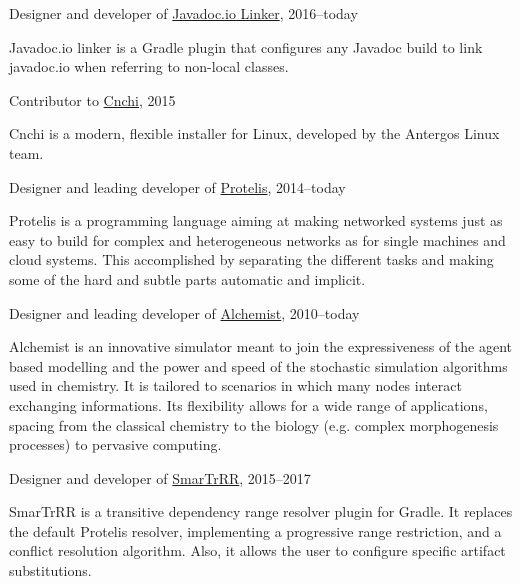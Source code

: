 \documentclass[10pt]{article}
\newenvironment{innerlist}[1][\enskip\textbullet]%
        {\begin{compactitem}[#1]}{\end{compactitem}}
\newcommand{\halfblankline}{\quad\vspace{-0.5\baselineskip}\pagebreak[3]}
\begin{document}
Designer and developer of \href{https://github.com/DanySK/javadoc.io-linker}{Javadoc.io Linker}, 2016--today
\begin{innerlist}
    \item Javadoc.io linker is a Gradle plugin that configures any Javadoc build to link javadoc.io when referring to non-local classes.
\end{innerlist}
\halfblankline

Contributor to \href{https://github.com/Antergos/Cnchi}{Cnchi}, 2015
\begin{innerlist}
    \item Cnchi is a modern, flexible installer for Linux, developed by the Antergos Linux team.
\end{innerlist}
\halfblankline

Designer and leading developer of \href{http://protelis.org/}{Protelis}, 2014--today
\begin{innerlist}
    \item Protelis is a programming language aiming at making networked systems just as easy to build for complex and heterogeneous networks as for single machines and cloud systems. This accomplished by separating the different tasks and making some of the hard and subtle parts automatic and implicit.
\end{innerlist}
\halfblankline

Designer and leading developer of \href{http://alchemist.apice.unibo.it/}{Alchemist}, 2010--today
\begin{innerlist}
    \item Alchemist is an innovative simulator meant to join the expressiveness of the agent based modelling and the power and speed of the stochastic simulation algorithms used in chemistry. It is tailored to scenarios in which many nodes interact exchanging  informations. Its flexibility allows for a wide range of applications, spacing from the classical chemistry to the biology (e.g. complex morphogenesis processes) to pervasive computing.
\end{innerlist}
\halfblankline

Designer and developer of \href{https://github.com/DanySK/SmarTrRR}{SmarTrRR}, 2015--2017
\begin{innerlist}
    \item SmarTrRR is a transitive dependency range resolver plugin for Gradle. It replaces the default Protelis resolver, implementing a progressive range restriction, and a conflict resolution algorithm. Also, it allows the user to configure specific artifact substitutions.
\end{innerlist}
\halfblankline
\end{document}
